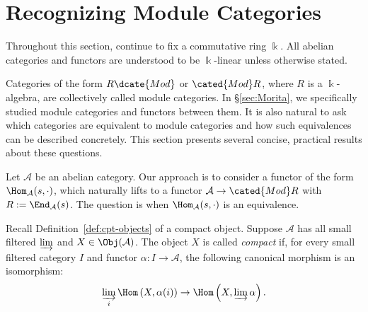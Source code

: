
\section{Recognizing Module Categories}\label{sec:module-cat}
\hypertarget{o014.aljabr2.chapter7.identifying-module-categories}{ }
Throughout this section, continue to fix a commutative ring $\Bbbk$. All
abelian categories and functors are understood to be $\Bbbk$-linear unless
otherwise stated.

Categories of the form $R\dcate{Mod}$ or $\cated{Mod}R$, where $R$ is a
$\Bbbk$-algebra, are collectively called module categories. In
\S\ref{sec:Morita}, we specifically studied module categories and functors
between them. It is also natural to ask which categories are equivalent to
module categories and how such equivalences can be described concretely.
This section presents several concise, practical results about these
questions.

Let $\mathcal{A}$ be an abelian category. Our approach is to consider a
functor of the form $\Hom_{\mathcal{A}}(s,\mathord\cdot)$, which naturally
lifts to a functor $\mathcal{A}\to\cated{Mod}R$ with
$R:=\End_{\mathcal{A}}(s)$. The question is when
$\Hom_{\mathcal{A}}(s,\mathord\cdot)$ is an equivalence.

Recall Definition~\ref{def:cpt-objects} of a compact object. Suppose
$\mathcal{A}$ has all small filtered $\varinjlim$ and
$X\in\Obj(\mathcal{A})$. The object $X$ is called \emph{compact} if, for
every small filtered category $I$ and functor $\alpha:I\to\mathcal{A}$, the
following canonical morphism is an isomorphism:
\[ \varinjlim_i \Hom\left( X, \alpha(i) \right) \to \Hom\left( X, \varinjlim \alpha \right). \]


